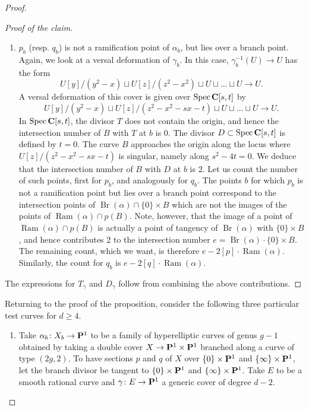 \documentclass{article}
\providecommand {\C}{{\bf C}}
\renewcommand {\P}{{\bf P}}
\providecommand {\from}{{\colon}}
\providecommand{\spec}{\operatorname{Spec}}
\DeclareMathOperator{\Br}{Br}
\DeclareMathOperator{\Ram}{Ram}
\numberwithin{equation}{section}
\begin{document}
\begin{proof}
\begin{proof}[Proof of the claim]
\begin{enumerate}
    \item $p_b$ (resp. $q_b$) is not a ramification point of
      $\alpha_b$, but lies over a branch point. Again, we look at a
      versal deformation of $\gamma_b$. In this case,
      $\gamma_b^{-1}(U) \to U$ has the form
        \[ U[y]/(y^2-x) \sqcup U[z]/(z^2-x^2) \sqcup U \sqcup \dots \sqcup U \to U.\]
      A versal deformation of this cover is given over $\spec \C[s,t]$ by
      \[ U[y]/(y^2-x) \sqcup U[z]/(z^2-x^2-sx-t) \sqcup U \sqcup \dots
      \sqcup U \to U.\] In $\spec \C[s,t]$, the divisor $T$ does not
      contain the origin, and hence the intersection number of $B$
      with $T$ at $b$ is $0$. The divisor $D \subset \spec \C[s,t]$ is
      defined by $t = 0$. The curve $B$ approaches the origin along
      the locus where $U[z]/(z^2-x^2-sx-t)$ is singular, namely along
      $s^2-4t = 0$. We deduce that the intersection number of $B$ with
      $D$ at $b$ is $2$. Let us count the number of such points, first
      for $p_b$, and analogously for $q_b$. The points $b$ for which
      $p_b$ is not a ramification point but lies over a branch point
      correspond to the intersection points of $\Br(\alpha) \cap \{0\}
      \times B$ which are not the images of the points of
      $\Ram(\alpha) \cap p(B)$. Note, however, that the image of a
      point of $\Ram(\alpha) \cap p(B)$ is actually a point of
      tangency of $\Br(\alpha)$ with $\{0\} \times B$, and hence
      contributes $2$ to the intersection number $e = \Br(\alpha)
      \cdot \{0\} \times B$. The remaining count, which we want, is
      therefore $e - 2[p]\cdot \Ram(\alpha)$. Similarly, the count for
      $q_b$ is $e - 2[q] \cdot \Ram(\alpha)$.
     \end{enumerate}
     The expressions for $T_\gamma$ and $D_\gamma$ follow from combining the above contributions.
  \end{proof}
  Returning to the proof of the proposition, consider the following three particular test curves for $d \geq 4$.
  \begin{enumerate}[$B_1$:]
  \item Take $\alpha_b \from X_b \to \P^1$ to be a family of hyperelliptic curves of genus $g-1$ obtained by taking a double cover $X \to \P^1 \times \P^1$ branched along a curve of type $(2g, 2)$. To have sections $p$ and $q$ of $X$ over $\{0\} \times \P^1$ and $\{\infty\} \times \P^1$, let the branch divisor be tangent to $\{0\} \times \P^1$ and $\{\infty\} \times \P^1$. Take $E$ to be a smooth rational curve and $\gamma \from E \to \P^1$ a generic cover of degree $d-2$.

\end{enumerate}
\end{proof}
\end{document}
